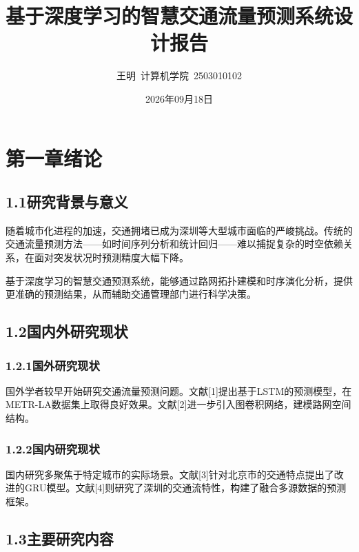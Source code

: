 \documentclass{harryopo-report}
\title{基于深度学习的智慧交通流量预测系统设计报告}
\author{王明\ 计算机学院\ 2503010102}
\institute{示例大学}
\date{2026年09月18日}
\begin{document}
\maketitle

\tableofcontents

\chapter*{第一章绪论}

\section*{1.1研究背景与意义}

随着城市化进程的加速，交通拥堵已成为深圳等大型城市面临的严峻挑战。传统的交通流量预测方法——如时间序列分析和统计回归——难以捕捉复杂的时空依赖关系，在面对突发状况时预测精度大幅下降。

基于深度学习的智慧交通预测系统，能够通过路网拓扑建模和时序演化分析，提供更准确的预测结果，从而辅助交通管理部门进行科学决策。

\section*{1.2国内外研究现状}

\subsection*{1.2.1国外研究现状}

国外学者较早开始研究交通流量预测问题。文献[1]提出基于LSTM的预测模型，在METR-LA数据集上取得良好效果。文献[2]进一步引入图卷积网络，建模路网空间结构。

\subsection*{1.2.2国内研究现状}

国内研究多聚焦于特定城市的实际场景。文献[3]针对北京市的交通特点提出了改进的GRU模型。文献[4]则研究了深圳的交通流特性，构建了融合多源数据的预测框架。

\section*{1.3主要研究内容}
\end{document}
